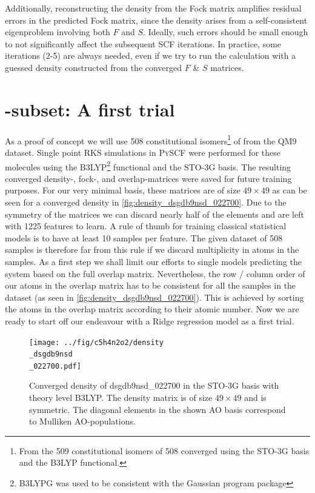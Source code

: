 Additionally, reconstructing the density from the Fock matrix amplifies residual errors in the predicted Fock matrix, since the density arises from a self-consistent eigenproblem involving both $F$ and $S$. Ideally, such errors should be small enough to not significantly affect the subsequent SCF iterations. In practice, some iterations (2-5) are always needed, even if we try to run the calculation with a guessed density constructed from the converged $F$ \& $S$ matrices.\\

\section{-subset: A first trial}
\label{sec:qm9_c5h4n2o2}

As a proof of concept we will use 508 constitutional isomers\footnote{From the 509 constitutional isomers of  508 converged using the STO-3G basis and the B3LYP functional.} of  from the QM9 dataset. 
Single point RKS simulations in \textsc{PySCF} \parencite{ref:pyscf} were performed for these molecules using the B3LYP\footnote{B3LYPG was used to be consistent with the Gaussian program package} functional and the STO-3G basis. The resulting converged density-, fock-, and overlap-matrices were saved for future training purposes. For our very minimal basis, these matrices are of size $49 \times 49$ as can be seen for a converged density in \autoref{fig:density_dsgdb9nsd_022700}. 
Due to the symmetry of the matrices we can discard nearly half of the elements and are left with 1225 features to learn. A rule of thumb for training classical statistical models is to have at least 10 samples per feature. \parencite{ref:rule_of_10} The given dataset of 508 samples is therefore far from this rule if we discard multiplicity in atoms in the samples. As a first step we shall limit our efforts to single models predicting the system based on the full overlap matrix. Nevertheless, the row / column order of our atoms in the overlap matrix has to be consistent for all the samples in the dataset (as seen in \autoref{fig:density_dsgdb9nsd_022700}). This is achieved by sorting the atoms in the overlap matrix according to their atomic number. Now we are ready to start off our endeavour with a Ridge regression model as a first trial. 

\begin{figure}[H]
    \centering
    \texttt{[image: ../fig/c5h4n2o2/density\\\_dsgdb9nsd\\\_022700.pdf]}
    \caption[Density of dsgdb9nsd\_022700 in STO-3G basis \& theory level B3LYP]{Converged density of dsgdb9nsd\_022700 in the STO-3G basis with theory level B3LYP. The density matrix is of size $49 \times 49$ and is symmetric. The diagonal elements in the shown AO basis correspond to Mulliken AO-populations. }
    \label{fig:density_dsgdb9nsd_022700}
\end{figure}


